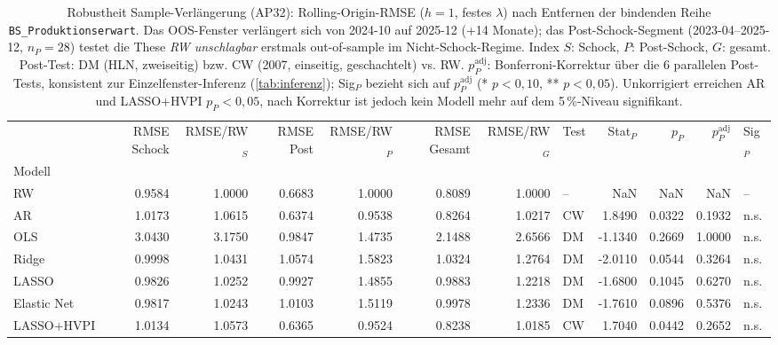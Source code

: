 \begin{table}
\caption{Robustheit Sample-Verlängerung (AP32): Rolling-Origin-RMSE ($h=1$, festes $\lambda$) nach Entfernen der bindenden Reihe \texttt{BS\_Produktionserwart}. Das OOS-Fenster verlängert sich von 2024-10 auf 2025-12 (+14 Monate); das Post-Schock-Segment (2023-04--2025-12, $n_P=28$) testet die These \emph{RW unschlagbar} erstmals out-of-sample im Nicht-Schock-Regime. Index $S$: Schock, $P$: Post-Schock, $G$: gesamt. Post-Test: DM (HLN, zweiseitig) bzw. CW (2007, einseitig, geschachtelt) vs. RW. $p_P^{\mathrm{adj}}$: Bonferroni-Korrektur über die 6 parallelen Post-Tests, konsistent zur Einzelfenster-Inferenz (\cref{tab:inferenz}); Sig$_P$ bezieht sich auf $p_P^{\mathrm{adj}}$ (* $p<0{,}10$, ** $p<0{,}05$). Unkorrigiert erreichen AR und LASSO+HVPI $p_P<0{,}05$, nach Korrektur ist jedoch kein Modell mehr auf dem 5\,\%-Niveau signifikant.}
\label{tab:robustheit_extended}
\begin{tabular}{lrrrrrrlrrrl}
\toprule
 & RMSE Schock & RMSE/RW$_{S}$ & RMSE Post & RMSE/RW$_{P}$ & RMSE Gesamt & RMSE/RW$_{G}$ & Test & Stat$_P$ & $p_P$ & $p_P^{\mathrm{adj}}$ & Sig$_P$ \\
Modell &  &  &  &  &  &  &  &  &  &  &  \\
\midrule
RW & 0.9584 & 1.0000 & 0.6683 & 1.0000 & 0.8089 & 1.0000 & – & NaN & NaN & NaN & – \\
AR & 1.0173 & 1.0615 & 0.6374 & 0.9538 & 0.8264 & 1.0217 & CW & 1.8490 & 0.0322 & 0.1932 & n.s. \\
OLS & 3.0430 & 3.1750 & 0.9847 & 1.4735 & 2.1488 & 2.6566 & DM & -1.1340 & 0.2669 & 1.0000 & n.s. \\
Ridge & 0.9998 & 1.0431 & 1.0574 & 1.5823 & 1.0324 & 1.2764 & DM & -2.0110 & 0.0544 & 0.3264 & n.s. \\
LASSO & 0.9826 & 1.0252 & 0.9927 & 1.4855 & 0.9883 & 1.2218 & DM & -1.6800 & 0.1045 & 0.6270 & n.s. \\
Elastic Net & 0.9817 & 1.0243 & 1.0103 & 1.5119 & 0.9978 & 1.2336 & DM & -1.7610 & 0.0896 & 0.5376 & n.s. \\
LASSO+HVPI & 1.0134 & 1.0573 & 0.6365 & 0.9524 & 0.8238 & 1.0185 & CW & 1.7040 & 0.0442 & 0.2652 & n.s. \\
\bottomrule
\end{tabular}
\end{table}
